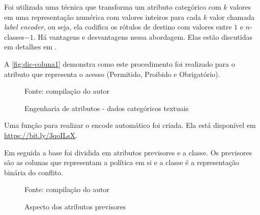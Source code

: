 Foi utilizada uma técnica que transforma um atributo categórico com $k$ valores em uma representação numérica com valores inteiros para cada $k$ valor chamada \textit{label encoder}, ou seja, ela codifica os rótulos de destino com valores entre $1$ e $n$-classes$-1$. Há vantagens e desvantagens nessa abordagem. Elas estão discutidas em detalhes em .

A \autoref{fig:dic-coluna1} demonstra como este procedimento foi realizado para o atributo que representa o acesso (Permitido, Proibido e Obrigatório).

\begin{figure}[h]
	\centering
	\caption{Engenharia de atributos - dados categóricos textuais}
	
	\label{fig:dic-coluna1}
	{\scriptsize Fonte: compilação do autor}
\end{figure}

Uma função para realizar o encode automático foi criada. Ela está disponível em \hyperlink{https://bit.ly/3qoILsX}{https://bit.ly/3qoILsX}.

Em seguida a base foi dividida em atributos previsores e a classe. Os previsores são as colunas que representam a política em si e a classe é a representação binária do conflito.

\begin{figure}[H]
	\centering
	\caption{Aspecto dos atributos previsores}
	
	\label{fig:previsores}
	{\scriptsize Fonte: compilação do autor}
\end{figure}

